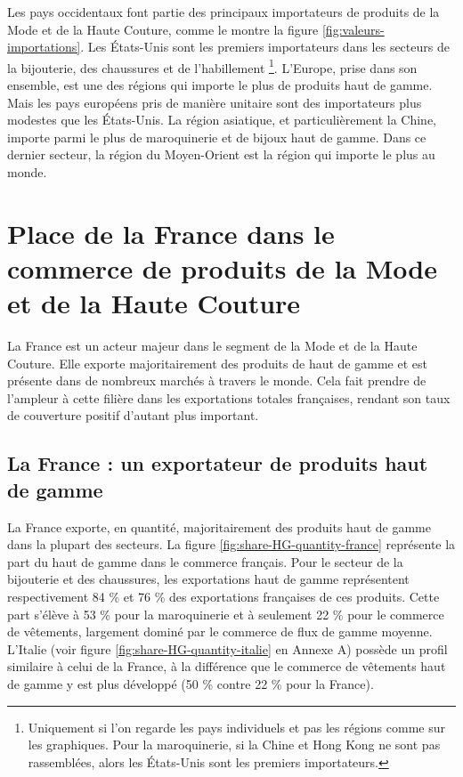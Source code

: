 \documentclass[french,10pt,a4paper]{article}
\begin{document}
Les pays occidentaux font partie des principaux importateurs de produits de la Mode et de la Haute Couture, comme le montre la figure \ref{fig:valeurs-importations}. Les États-Unis sont les premiers importateurs dans les secteurs de la bijouterie, des chaussures et de l'habillement \footnote{Uniquement si l'on regarde les pays individuels et pas les régions comme sur les graphiques. Pour la maroquinerie, si la Chine et Hong Kong ne sont pas rassemblées, alors les États-Unis sont les premiers importateurs.}. L'Europe, prise dans son ensemble, est une des régions qui importe le plus de produits haut de gamme. Mais les pays européens pris de manière unitaire sont des importateurs plus modestes que les États-Unis. La région asiatique, et particulièrement la Chine, importe parmi le plus de maroquinerie et de bijoux haut de gamme. Dans ce dernier secteur, la région du Moyen-Orient est la région qui importe le plus au monde. 


\newpage

\section{Place de la France dans le commerce de produits de la Mode et de la Haute Couture}

La France est un acteur majeur dans le segment de la Mode et de la Haute Couture. Elle exporte majoritairement des produits de haut de gamme et est présente dans de nombreux marchés à travers le monde. Cela fait prendre de l'ampleur à cette filière dans les exportations totales françaises, rendant son taux de couverture positif d'autant plus important.


\subsection{La France : un exportateur de produits haut de gamme}

La France exporte, en quantité, majoritairement des produits haut de gamme dans la plupart des secteurs. La figure \ref{fig:share-HG-quantity-france} représente la part du haut de gamme dans le commerce français. Pour le secteur de la bijouterie et des chaussures, les exportations haut de gamme représentent respectivement 84 \% et 76 \% des exportations françaises de ces produits. Cette part s'élève à 53 \% pour la maroquinerie et à seulement 22 \% pour le commerce de vêtements, largement dominé par le commerce de flux de gamme moyenne. L'Italie (voir figure \ref{fig:share-HG-quantity-italie} en Annexe A) possède un profil similaire à celui de la France, à la différence que le commerce de vêtements haut de gamme y est plus développé (50 \% contre 22 \% pour la France).
\end{document}
